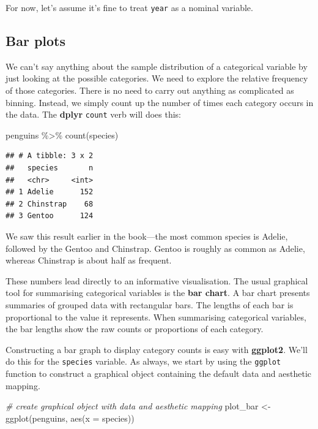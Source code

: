 \documentclass[
]{book}
\newenvironment{Shaded}{\begin{snugshade}}{\end{snugshade}}
\newcommand{\AttributeTok}[1]{\textcolor[rgb]{0.77,0.63,0.00}{#1}}
\newcommand{\CommentTok}[1]{\textcolor[rgb]{0.56,0.35,0.01}{\textit{#1}}}
\newcommand{\FunctionTok}[1]{\textcolor[rgb]{0.00,0.00,0.00}{#1}}
\newcommand{\NormalTok}[1]{#1}
\newcommand{\OtherTok}[1]{\textcolor[rgb]{0.56,0.35,0.01}{#1}}
\newcommand{\SpecialCharTok}[1]{\textcolor[rgb]{0.00,0.00,0.00}{#1}}
\begin{document}
For now, let's assume it's fine to treat \texttt{year} as a nominal variable.

\hypertarget{bar-plots}{%
\subsection{Bar plots}\label{bar-plots}}

We can't say anything about the sample distribution of a categorical variable by just looking at the possible categories. We need to explore the relative frequency of those categories. There is no need to carry out anything as complicated as binning. Instead, we simply count up the number of times each category occurs in the data. The \textbf{dplyr} \texttt{count} verb will does this:

\begin{Shaded}
\begin{Highlighting}[]
\NormalTok{penguins }\SpecialCharTok{\%\textgreater{}\%} \FunctionTok{count}\NormalTok{(species)}
\end{Highlighting}
\end{Shaded}

\begin{verbatim}
## # A tibble: 3 x 2
##   species       n
##   <chr>     <int>
## 1 Adelie      152
## 2 Chinstrap    68
## 3 Gentoo      124
\end{verbatim}

We saw this result earlier in the book---the most common species is Adelie, followed by the Gentoo and Chinstrap. Gentoo is roughly as common as Adelie, whereas Chinstrap is about half as frequent.

These numbers lead directly to an informative visualisation. The usual graphical tool for summarising categorical variables is the \textbf{bar chart}. A bar chart presents summaries of grouped data with rectangular bars. The lengths of each bar is proportional to the value it represents. When summarising categorical variables, the bar lengths show the raw counts or proportions of each category.

Constructing a bar graph to display category counts is easy with \textbf{ggplot2}. We'll do this for the \texttt{species} variable. As always, we start by using the \texttt{ggplot} function to construct a graphical object containing the default data and aesthetic mapping.

\begin{Shaded}
\begin{Highlighting}[]
\CommentTok{\# create graphical object with data and aesthetic mapping}
\NormalTok{plot\_bar }\OtherTok{\textless{}{-}} \FunctionTok{ggplot}\NormalTok{(penguins, }\FunctionTok{aes}\NormalTok{(}\AttributeTok{x =}\NormalTok{ species)) }
\end{Highlighting}
\end{Shaded}
\end{document}
